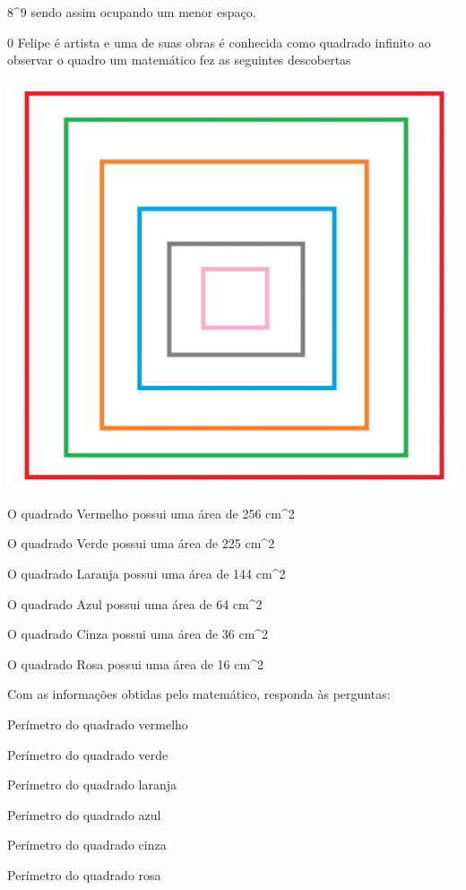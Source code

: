8^9 sendo assim ocupando um
menor espaço.

\num{0} Felipe é artista e uma de suas obras é conhecida como quadrado
infinito ao observar o quadro um matemático fez as seguintes descobertas

\includegraphics[width=2\times 3125in,height=2\times 07917in]{./imgSAEB_8_MAT/media/image2.png}

O quadrado Vermelho possui uma área de 256 cm^2

O quadrado Verde possui uma área de 225 cm^2

O quadrado Laranja possui uma área de 144 cm^2

O quadrado Azul possui uma área de 64 cm^2

O quadrado Cinza possui uma área de 36 cm^2

O quadrado Rosa possui uma área de 16 cm^2

Com as informações obtidas pelo matemático, responda às perguntas:

\item Perímetro do quadrado vermelho
\item Perímetro do quadrado verde
\item Perímetro do quadrado laranja
\item Perímetro do quadrado azul
\item Perímetro do quadrado cinza
\item Perímetro do quadrado rosa

